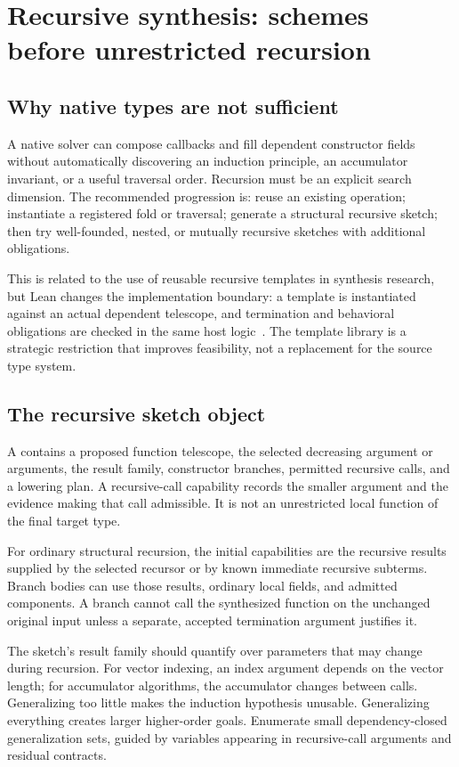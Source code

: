 \section{Recursive synthesis: schemes before unrestricted recursion}
\label{sec:recursion}

\subsection{Why native types are not sufficient}

A native solver can compose callbacks and fill dependent constructor fields without automatically discovering an induction principle, an accumulator invariant, or a useful traversal order. Recursion must be an explicit search dimension. The recommended progression is: reuse an existing operation; instantiate a registered fold or traversal; generate a structural recursive sketch; then try well-founded, nested, or mutually recursive sketches with additional obligations.

This is related to the use of reusable recursive templates in synthesis research, but Lean changes the implementation boundary: a template is instantiated against an actual dependent telescope, and termination and behavioral obligations are checked in the same host logic~\cite{adt-templates}. The template library is a strategic restriction that improves feasibility, not a replacement for the source type system.

\subsection{The recursive sketch object}

A  contains a proposed function telescope, the selected decreasing argument or arguments, the result family, constructor branches, permitted recursive calls, and a lowering plan. A recursive-call capability records the smaller argument and the evidence making that call admissible. It is not an unrestricted local function of the final target type.

For ordinary structural recursion, the initial capabilities are the recursive results supplied by the selected recursor or by known immediate recursive subterms. Branch bodies can use those results, ordinary local fields, and admitted components. A branch cannot call the synthesized function on the unchanged original input unless a separate, accepted termination argument justifies it.

The sketch's result family should quantify over parameters that may change during recursion. For vector indexing, an index argument depends on the vector length; for accumulator algorithms, the accumulator changes between calls. Generalizing too little makes the induction hypothesis unusable. Generalizing everything creates larger higher-order goals. Enumerate small dependency-closed generalization sets, guided by variables appearing in recursive-call arguments and residual contracts.

